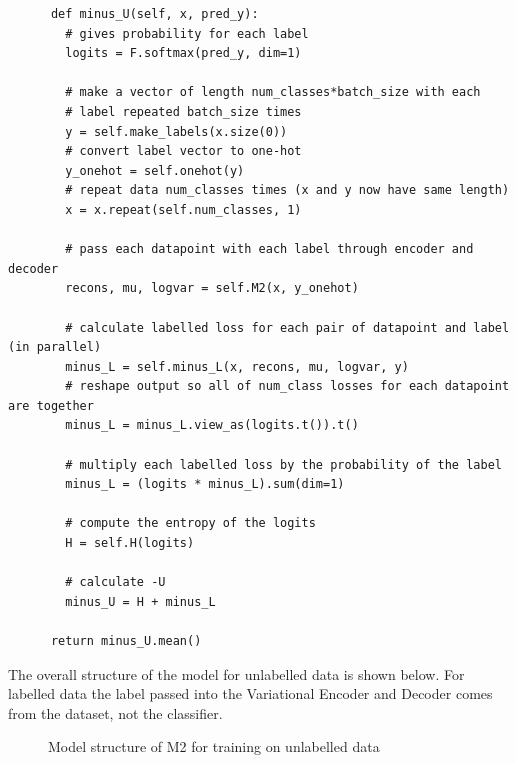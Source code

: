 {\renewcommand{\baselinestretch}{0.8}\small
    \begin{verbatim}
      def minus_U(self, x, pred_y):
        # gives probability for each label
        logits = F.softmax(pred_y, dim=1)

        # make a vector of length num_classes*batch_size with each 
        # label repeated batch_size times
        y = self.make_labels(x.size(0))
        # convert label vector to one-hot
        y_onehot = self.onehot(y)
        # repeat data num_classes times (x and y now have same length)
        x = x.repeat(self.num_classes, 1)

        # pass each datapoint with each label through encoder and decoder
        recons, mu, logvar = self.M2(x, y_onehot)
        
        # calculate labelled loss for each pair of datapoint and label (in parallel)
        minus_L = self.minus_L(x, recons, mu, logvar, y)
        # reshape output so all of num_class losses for each datapoint are together
        minus_L = minus_L.view_as(logits.t()).t()
        
        # multiply each labelled loss by the probability of the label
        minus_L = (logits * minus_L).sum(dim=1)

        # compute the entropy of the logits
        H = self.H(logits)

        # calculate -U
        minus_U = H + minus_L

      return minus_U.mean()
    \end{verbatim}
}

The overall structure of the model for unlabelled data is shown below. For labelled data the label passed into the Variational Encoder 
and Decoder comes from the dataset, not the classifier.

\begin{figure}[H]
  \centering
  \caption{Model structure of M2 for training on unlabelled data}
\end{figure}

